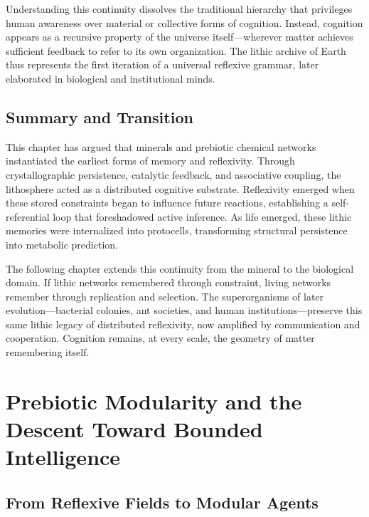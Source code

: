 \documentclass[11pt,a4paper]{article}
\begin{document}
Understanding this continuity dissolves the traditional hierarchy that privileges human awareness over material or collective forms of cognition.  Instead, cognition appears as a recursive property of the universe itself—wherever matter achieves sufficient feedback to refer to its own organization.  The lithic archive of Earth thus represents the first iteration of a universal reflexive grammar, later elaborated in biological and institutional minds.

\subsection{Summary and Transition}

This chapter has argued that minerals and prebiotic chemical networks instantiated the earliest forms of memory and reflexivity.  Through crystallographic persistence, catalytic feedback, and associative coupling, the lithosphere acted as a distributed cognitive substrate.  Reflexivity emerged when these stored constraints began to influence future reactions, establishing a self-referential loop that foreshadowed active inference.  As life emerged, these lithic memories were internalized into protocells, transforming structural persistence into metabolic prediction.

The following chapter extends this continuity from the mineral to the biological domain.  If lithic networks remembered through constraint, living networks remember through replication and selection.  The superorganisms of later evolution—bacterial colonies, ant societies, and human institutions—preserve this same lithic legacy of distributed reflexivity, now amplified by communication and cooperation.  Cognition remains, at every scale, the geometry of matter remembering itself.


\section{Prebiotic Modularity and the Descent Toward Bounded Intelligence}
\label{sec:modularity}

\subsection{From Reflexive Fields to Modular Agents}
\end{document}
